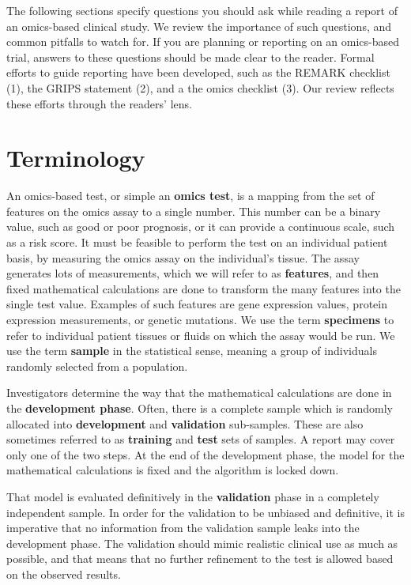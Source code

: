 \documentclass[11pt]{article}
\begin{document}
The following sections specify questions you should ask while reading a
report of an omics-based clinical study. We review the importance of
such questions, and common pitfalls to watch for. If you are planning or
reporting on an omics-based trial, answers to these questions should be
made clear to the reader. Formal efforts to guide reporting have been
developed, such as the REMARK checklist (1), the GRIPS statement (2),
and a the omics checklist (3). Our review reflects these efforts through
the readers' lens.

\section{Terminology}\label{terminology}

An omics-based test, or simple an \textbf{omics test}, is a mapping from
the set of features on the omics assay to a single number. This number
can be a binary value, such as good or poor prognosis, or it can provide
a continuous scale, such as a risk score. It must be feasible to perform
the test on an individual patient basis, by measuring the omics assay on
the individual's tissue. The assay generates lots of measurements, which
we will refer to as \textbf{features}, and then fixed mathematical
calculations are done to transform the many features into the single
test value. Examples of such features are gene expression values,
protein expression measurements, or genetic mutations. We use the term
\textbf{specimens} to refer to individual patient tissues or fluids on
which the assay would be run. We use the term \textbf{sample} in the
statistical sense, meaning a group of individuals randomly selected from
a population.

Investigators determine the way that the mathematical calculations are
done in the \textbf{development phase}. Often, there is a complete
sample which is randomly allocated into \textbf{development} and
\textbf{validation} sub-samples. These are also sometimes referred to as
\textbf{training} and \textbf{test} sets of samples. A report may cover
only one of the two steps. At the end of the development phase, the
model for the mathematical calculations is fixed and the algorithm is
locked down.

That model is evaluated definitively in the \textbf{validation} phase in
a completely independent sample. In order for the validation to be
unbiased and definitive, it is imperative that no information from the
validation sample leaks into the development phase. The validation
should mimic realistic clinical use as much as possible, and that means
that no further refinement to the test is allowed based on the observed
results.
\end{document}
